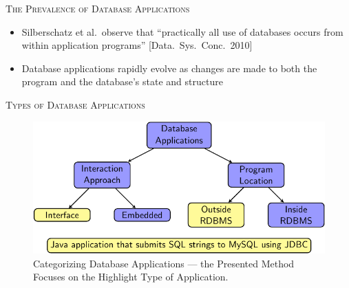 \documentclass[final,t]{beamer}
\begin{document}
\begin{frame}{}
\begin{columns}[t]
\begin{column}{.325\linewidth}
\begin{block}{\textsc{The Prevalence of Database Applications}}
\begin{figure}
	  \end{figure}
          \vspace*{-.2in}

      	  \begin{itemize}
          
            \item Silberschatz et al.\ observe that ``practically all
              use of databases occurs from within application
              programs'' \mbox{[Data. Sys. Conc. 2010]}

            \item Database applications rapidly evolve as changes are
              made to both the program and the database's state and
              structure

          
          \end{itemize}

        \end{block}

	\begin{block}{\textsc{Types of Database Applications}}

          \begin{figure}			
  	    \centering
            \includegraphics[width=.95\linewidth]{categorize_database_applications_wrapper_crop}
            \vspace*{.05in}
	    \caption{Categorizing Database Applications --- the Presented Method Focuses on the Highlight Type of Application.}

	  \end{figure}
          \vspace*{-.2in}


\end{block}
\end{column}
\end{columns}
\end{frame}
\end{document}
